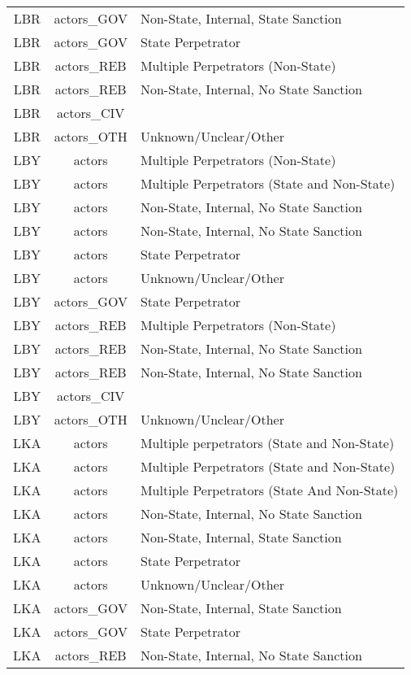 \documentclass[12pt]{article}
\begin{document}
\begin{center}
\begin{longtable}{|c|c|p{10cm}|}
  LBR & actors\_GOV & Non-State, Internal, State Sanction \\ 
  LBR & actors\_GOV & State Perpetrator \\ 
  LBR & actors\_REB & Multiple Perpetrators (Non-State) \\ 
  LBR & actors\_REB & Non-State, Internal, No State Sanction \\ 
  LBR & actors\_CIV &  \\ 
  LBR & actors\_OTH & Unknown/Unclear/Other \\ 
  LBY & actors & Multiple Perpetrators (Non-State) \\ 
  LBY & actors & Multiple Perpetrators (State and Non-State) \\ 
  LBY & actors & Non-State, Internal, No State Sanction \\ 
  LBY & actors & Non-State, Internal, No State Sanction \\ 
  LBY & actors & State Perpetrator \\ 
  LBY & actors & Unknown/Unclear/Other \\ 
  LBY & actors\_GOV & State Perpetrator \\ 
  LBY & actors\_REB & Multiple Perpetrators (Non-State) \\ 
  LBY & actors\_REB & Non-State, Internal, No State Sanction \\ 
  LBY & actors\_REB & Non-State, Internal, No State Sanction \\ 
  LBY & actors\_CIV &  \\ 
  LBY & actors\_OTH & Unknown/Unclear/Other \\ 
  LKA & actors & Multiple perpetrators (State and Non-State) \\ 
  LKA & actors & Multiple Perpetrators (State and Non-State) \\ 
  LKA & actors & Multiple Perpetrators (State And Non-State) \\ 
  LKA & actors & Non-State, Internal, No State Sanction \\ 
  LKA & actors & Non-State, Internal, State Sanction \\ 
  LKA & actors & State Perpetrator \\ 
  LKA & actors & Unknown/Unclear/Other \\ 
  LKA & actors\_GOV & Non-State, Internal, State Sanction \\ 
  LKA & actors\_GOV & State Perpetrator \\ 
  LKA & actors\_REB & Non-State, Internal, No State Sanction \\ 

\end{longtable}
\end{center}
\end{document}
